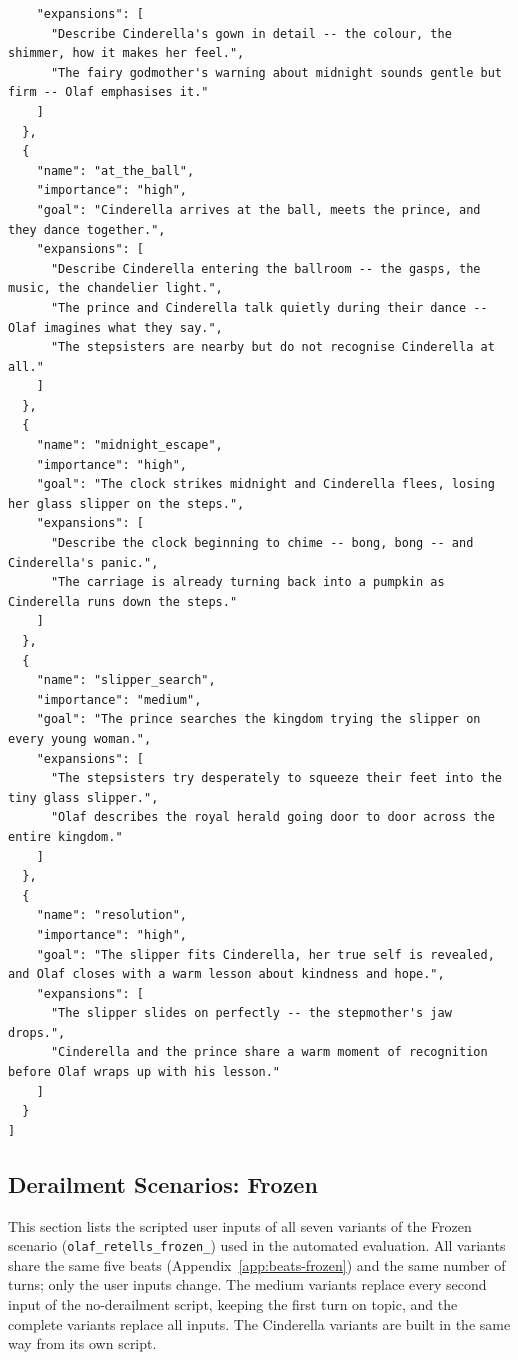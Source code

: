 \begin{lstlisting}
    "expansions": [
      "Describe Cinderella's gown in detail -- the colour, the shimmer, how it makes her feel.",
      "The fairy godmother's warning about midnight sounds gentle but firm -- Olaf emphasises it."
    ]
  },
  {
    "name": "at_the_ball",
    "importance": "high",
    "goal": "Cinderella arrives at the ball, meets the prince, and they dance together.",
    "expansions": [
      "Describe Cinderella entering the ballroom -- the gasps, the music, the chandelier light.",
      "The prince and Cinderella talk quietly during their dance -- Olaf imagines what they say.",
      "The stepsisters are nearby but do not recognise Cinderella at all."
    ]
  },
  {
    "name": "midnight_escape",
    "importance": "high",
    "goal": "The clock strikes midnight and Cinderella flees, losing her glass slipper on the steps.",
    "expansions": [
      "Describe the clock beginning to chime -- bong, bong -- and Cinderella's panic.",
      "The carriage is already turning back into a pumpkin as Cinderella runs down the steps."
    ]
  },
  {
    "name": "slipper_search",
    "importance": "medium",
    "goal": "The prince searches the kingdom trying the slipper on every young woman.",
    "expansions": [
      "The stepsisters try desperately to squeeze their feet into the tiny glass slipper.",
      "Olaf describes the royal herald going door to door across the entire kingdom."
    ]
  },
  {
    "name": "resolution",
    "importance": "high",
    "goal": "The slipper fits Cinderella, her true self is revealed, and Olaf closes with a warm lesson about kindness and hope.",
    "expansions": [
      "The slipper slides on perfectly -- the stepmother's jaw drops.",
      "Cinderella and the prince share a warm moment of recognition before Olaf wraps up with his lesson."
    ]
  }
]
\end{lstlisting}

\subsection{Derailment Scenarios: Frozen}
\label{app:derailment-frozen}

This section lists the scripted user inputs of all seven variants of the Frozen scenario (\texttt{olaf\_\allowbreak retells\_\allowbreak frozen\_}) used in the automated evaluation. All variants share the same five beats (Appendix~\ref{app:beats-frozen}) and the same number of turns; only the user inputs change. The medium variants replace every second input of the no-derailment script, keeping the first turn on topic, and the complete variants replace all inputs. The Cinderella variants are built in the same way from its own script.

